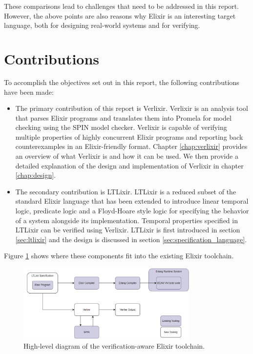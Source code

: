These comparisons lead to challenges that need to be addressed in this report. However, the above points are also reasons why Elixir is an interesting target language, both for designing real-world systems and for verifying.  
\section{Contributions}
To accomplish the objectives set out in this report, the following contributions have been made:
\begin{itemize}
    \item The primary contribution of this report is Verlixir. Verlixir is an analysis tool that parses Elixir programs and translates them into Promela \cite{promela} for model checking using the SPIN \cite{spin} model checker. Verlixir is capable of verifying multiple properties of highly concurrent Elixir programs and reporting back counterexamples in an Elixir-friendly format. Chapter \ref{chap:verlixir} provides an overview of what Verlixir is and how it can be used. We then provide a detailed explanation of the design and implementation of Verlixir in chapter \ref{chap:design}.
    \item The secondary contribution is LTLixir. LTLixir is a reduced subset of the standard Elixir language that has been extended to introduce linear temporal logic, predicate logic and a Floyd-Hoare style logic for specifying the behavior of a system alongside its implementation. Temporal properties specified in LTLixir can be verified using Verlixir. LTLixir is first introduced in section \ref{sec:ltlixir} and the design is discussed in section \ref{sec:specification_language}.
\end{itemize}
Figure \ref{fig:overview_dig} shows where these components fit into the existing Elixir toolchain.
\begin{figure}[H]
    \centering
    \includegraphics[width=0.8\textwidth]{images/high_level_system.png}
    \caption{High-level diagram of the verification-aware Elixir toolchain.}
    \label{fig:overview_dig}
\end{figure}